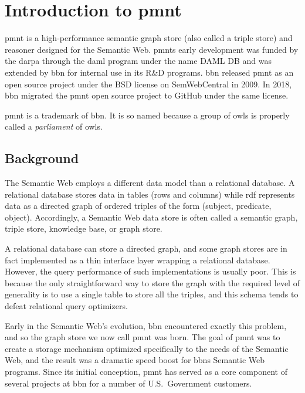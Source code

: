 
\chapter{Introduction to \acl{pmnt}}

\acl{pmnt} is a high-performance semantic graph store (also called a triple store) and reasoner designed for the Semantic Web.  \acp{pmnt} early development was funded by the \ac{darpa} through the \ac{daml} program under the name DAML DB and was extended by \ac{bbn} for internal use in its R\&D programs.  \ac{bbn} released \ac{pmnt} as an open source project under the BSD license on SemWebCentral in 2009.  In 2018, \ac{bbn} migrated the \ac{pmnt} open source project to GitHub under the same license.

\acl{pmnt} is a trademark of \acl{bbn}.  It is so named because a group of owls is properly called a \emph{parliament} of owls.

\section{Background}

The Semantic Web employs a different data model than a relational database.  A relational database stores data in tables (rows and columns) while \ac{rdf} represents data as a directed graph of ordered triples of the form (subject, predicate, object).  Accordingly, a Semantic Web data store is often called a semantic graph, triple store, knowledge base, or graph store.

A relational database can store a directed graph, and some graph stores are in fact implemented as a thin interface layer wrapping a relational database.  However, the query performance of such implementations is usually poor.  This is because the only straightforward way to store the graph with the required level of generality is to use a single table to store all the triples, and this schema tends to defeat relational query optimizers.

Early in the Semantic Web's evolution, \ac{bbn} encountered exactly this problem, and so the graph store we now call \ac{pmnt} was born.  The goal of \ac{pmnt} was to create a storage mechanism optimized specifically to the needs of the Semantic Web, and the result was a dramatic speed boost for \acp{bbn} Semantic Web programs.  Since its initial conception, \ac{pmnt} has served as a core component of several projects at \ac{bbn} for a number of U.S.\ Government customers.

